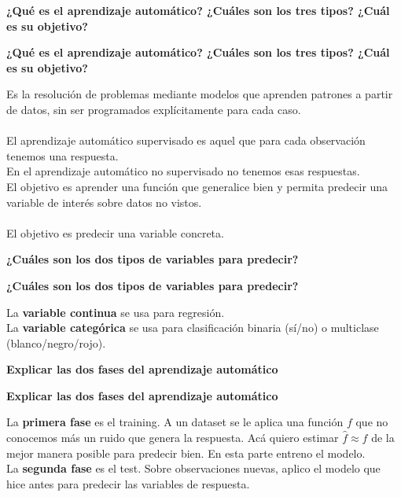 \documentclass[10pt]{memoir}
\begin{document}
\clearpage
\begin{center}
	\textbf{\Large ¿Qué es el aprendizaje automático? ¿Cuáles son los tres tipos? ¿Cuál es su objetivo?} \\
\end{center}

\clearpage
\begin{center}
	\textbf{\Large ¿Qué es el aprendizaje automático? ¿Cuáles son los tres tipos? ¿Cuál es su objetivo?} \\
\end{center}
\noindent Es la resolución de problemas mediante modelos que aprenden patrones a partir de datos, sin ser programados explícitamente para cada caso. \\
\\
\noindent El aprendizaje automático supervisado es aquel que para cada observación tenemos una respuesta. \\
En el aprendizaje automático no supervisado no tenemos esas respuestas. \\
El objetivo es aprender una función que generalice bien y permita predecir una variable de interés sobre datos no vistos. \\
\\
\noindent El objetivo es predecir una variable concreta.

\clearpage
\begin{center}
	\textbf{\Large ¿Cuáles son los dos tipos de variables para predecir?} \\
\end{center}

\clearpage
\begin{center}
	\textbf{\Large ¿Cuáles son los dos tipos de variables para predecir?} \\
\end{center}
\noindent La \textbf{variable continua} se usa para regresión. \\
La \textbf{variable categórica} se usa para clasificación binaria (sí/no) o multiclase (blanco/negro/rojo).

\clearpage
\begin{center}
	\textbf{\Large Explicar las dos fases del aprendizaje automático} \\
\end{center}

\clearpage
\begin{center}
	\textbf{\Large Explicar las dos fases del aprendizaje automático} \\
\end{center}
\noindent La \textbf{primera fase} es el training. A un dataset se le aplica una función $f$ que no conocemos más un ruido que genera la respuesta. Acá quiero estimar $\hat{f} \approx f$ de la mejor manera posible para predecir bien. En esta parte entreno el modelo. \\
La \textbf{segunda fase} es el test. Sobre observaciones nuevas, aplico el modelo que hice antes para predecir las variables de respuesta.
\end{document}
